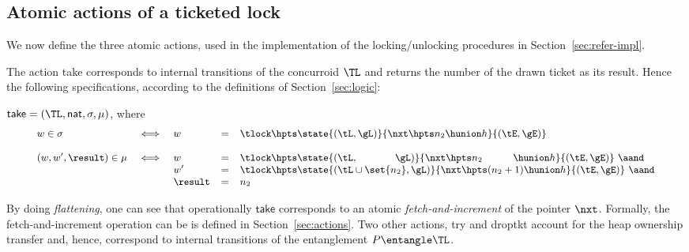 \subsection{Atomic actions of a ticketed lock}
\label{sec:atom-acti-tick}

We now define the three atomic actions, used in the implementation of
the locking/unlocking procedures in Section~\ref{sec:refer-impl}.

The action \textsf{take} corresponds to internal transitions of the
concurroid $\TL$ and returns the number of the drawn ticket as its
result. Hence the following specifications, according to the
definitions of Section~\ref{sec:logic}:
%
\begin{definition}
\label{def:take-act}
%
$\mathsf{take} = (\TL, \mathsf{nat}, \sigma, \mu)$, where
\[
{\small
\begin{array}{lclcl}
w \in \sigma & \iff & 
  w & = &\tlock \hpts \state{(\tL, \gL)}{\nxt \hpts n_2 \hunion h}{(\tE,
    \gE)}\\ \\
(w, w', \result) \in \mu & \iff & 
  w &= &\tlock \hpts \state{(\tL,~~~~~~~~~~~ \gL)}{\nxt \hpts n_2 ~~~~~~~~~\hunion h}{(\tE,
    \gE)} ~\aand\\
&&  w' &=& \tlock \hpts \state{(\tL \cup \set{n_2}, \gL)}{\nxt \hpts (n_2 + 1) \hunion h}{(\tE,
    \gE)} ~\aand\\
&&  \result &=& n_2
\end{array}}
\]
\end{definition}
%
By doing \emph{flattening}, one can see that operationally
$\mathsf{take}$ corresponds to an atomic \emph{fetch-and-increment} of
the pointer $\nxt$. Formally, the fetch-and-increment operation can be
is defined in Section~\ref{sec:actions}.
%
Two other actions, \textsf{try} and \textsf{droptkt} account for the
heap ownership transfer and, hence, correspond to internal transitions
of the entanglement $P \entangle \TL$.

